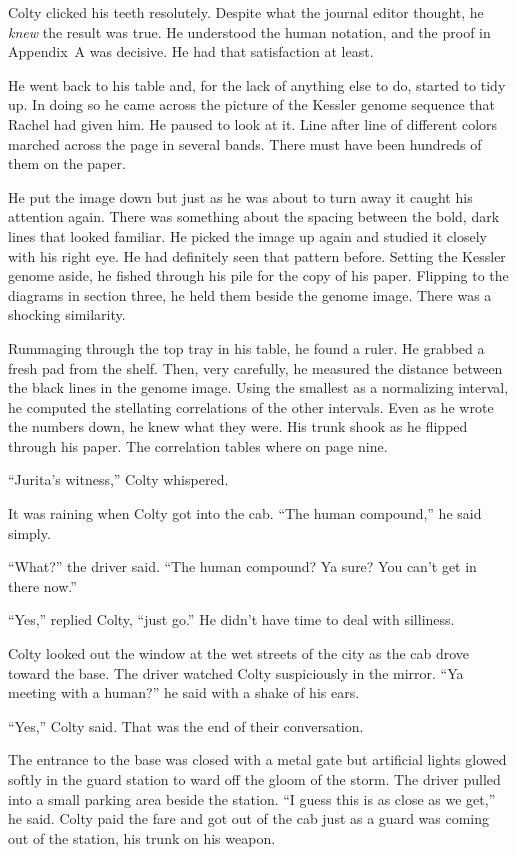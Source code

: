 Colty clicked his teeth resolutely. Despite what the journal editor thought, he \emph{knew} the
result was true. He understood the human notation, and the proof in Appendix~A was decisive. He
had that satisfaction at least.

He went back to his table and, for the lack of anything else to do, started to tidy up. In doing
so he came across the picture of the Kessler genome sequence that Rachel had given him. He
paused to look at it. Line after line of different colors marched across the page in several
bands. There must have been hundreds of them on the paper.

He put the image down but just as he was about to turn away it caught his attention again. There
was something about the spacing between the bold, dark lines that looked familiar. He picked the
image up again and studied it closely with his right eye. He had definitely seen that pattern
before. Setting the Kessler genome aside, he fished through his pile for the copy of his paper.
Flipping to the diagrams in section three, he held them beside the genome image. There was a
shocking similarity.

Rummaging through the top tray in his table, he found a ruler. He grabbed a fresh pad from the
shelf. Then, very carefully, he measured the distance between the black lines in the genome
image. Using the smallest as a normalizing interval, he computed the stellating correlations of
the other intervals. Even as he wrote the numbers down, he knew what they were. His trunk shook
as he flipped through his paper. The correlation tables where on page nine.

``Jurita's witness,'' Colty whispered.

It was raining when Colty got into the cab. ``The human compound,'' he said simply.

``What?'' the driver said. ``The human compound? Ya sure? You can't get in there now.''

``Yes,'' replied Colty, ``just go.'' He didn't have time to deal with silliness.

Colty looked out the window at the wet streets of the city as the cab drove toward the base. The
driver watched Colty suspiciously in the mirror. ``Ya meeting with a human?'' he said with a
shake of his ears.

``Yes,'' Colty said. That was the end of their conversation.

The entrance to the base was closed with a metal gate but artificial lights glowed softly in the
guard station to ward off the gloom of the storm. The driver pulled into a small parking area
beside the station. ``I guess this is as close as we get,'' he said. Colty paid the fare and got
out of the cab just as a guard was coming out of the station, his trunk on his weapon.

